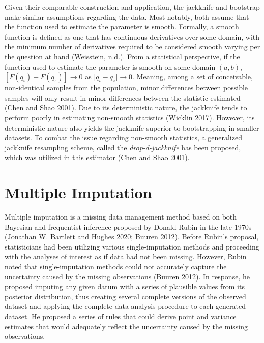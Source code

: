 \documentclass[
  letterpaper,
  DIV=11,
  numbers=noendperiod]{scrreprt}
\begin{document}
Given their comparable construction and application, the jackknife and
bootstrap make similar assumptions regarding the data. Most notably,
both assume that the function used to estimate the parameter is smooth.
Formally, a smooth function is defined as one that has continuous
derivatives over some domain, with the minimum number of derivatives
required to be considered smooth varying per the question at hand
(Weisstein, n.d.). From a statistical perspective, if the function used
to estimate the parameter is smooth on some domain \((a, b)\),
\([F(q_i) - F(q_z)] \rightarrow 0\) as
\(\lvert q_i - q_z\rvert \rightarrow 0\). Meaning, among a set of
conceivable, non-identical samples from the population, minor
differences between possible samples will only result in minor
differences between the statistic estimated (Chen and Shao 2001). Due to
its deterministic nature, the jackknife tends to perform poorly in
estimating non-smooth statistics (Wicklin 2017). However, its
deterministic nature also yields the jackknife superior to bootstrapping
in smaller datasets. To combat the issue regarding non-smooth
statistics, a generalized jackknife resampling scheme, called the
\emph{drop-d-jackknife} has been proposed, which was utilized in this
estimator (Chen and Shao 2001).

\hypertarget{multiple-imputation}{%
\section{Multiple Imputation}\label{multiple-imputation}}

Multiple imputation is a missing data management method based on both
Bayesian and frequentist inference proposed by Donald Rubin in the late
1970s (Jonathan W. Bartlett and Hughes 2020; Buuren 2012). Before
Rubin's proposal, statisticians had been utilizing various
single-imputation methods and proceeding with the analyses of interest
as if data had not been missing. However, Rubin noted that
single-imputation methods could not accurately capture the uncertainty
caused by the missing observations (Buuren 2012). In response, he
proposed imputing any given datum with a series of plausible values from
its posterior distribution, thus creating several complete versions of
the observed dataset and applying the complete data analysis procedure
to each generated dataset. He proposed a series of rules that could
derive point and variance estimates that would adequately reflect the
uncertainty caused by the missing observations.
\end{document}
